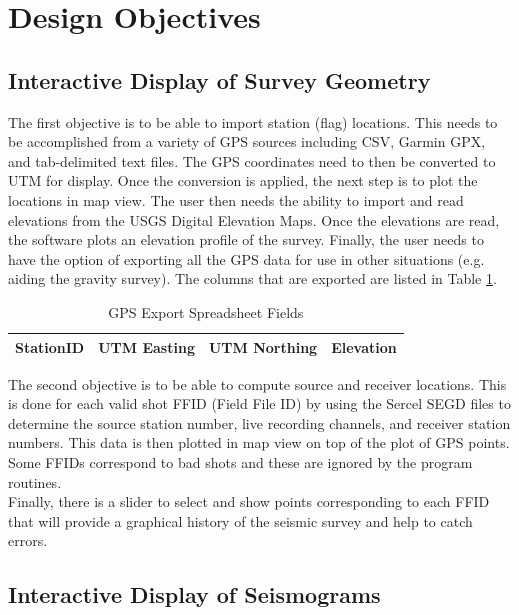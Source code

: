 \documentclass[12pt]{article}
\begin{document}
\section{Design Objectives}
\subsection{Interactive Display of Survey Geometry}

The first objective is to be able to import station (flag) locations. This needs to be accomplished from a variety of GPS sources including CSV, Garmin GPX, and tab-delimited text files. The GPS coordinates need to then be converted to UTM for display. Once the conversion is applied, the next step is to plot the locations in map view. The user then needs the ability to import and read elevations from the USGS Digital Elevation Maps. Once the elevations are read, the software plots an elevation profile of the survey. Finally, the user needs to have the option of exporting all the GPS data for use in other situations (e.g. aiding the gravity survey). The columns that are exported are listed in Table \ref{TAB:GPS}.

\begin{table}[h]
\caption{GPS Export Spreadsheet Fields}
\centering
\begin{tabular}{ c | c | c | c}
  \hline                  
  StationID & UTM Easting & UTM Northing & Elevation \\
  \hline
\end{tabular}
\label{TAB:GPS}
\end{table}

The second objective is to be able to compute source and receiver locations. This is done for each valid shot FFID (Field File ID) by using the Sercel SEGD files to determine the source station number, live recording channels, and receiver station numbers. This data is then plotted in map view on top of the plot of GPS points. Some FFIDs correspond to bad shots and these are ignored by the program routines.  \\

Finally, there is a slider to select and show points corresponding to each FFID that will provide a graphical history of the seismic survey and help to catch errors. 

\subsection{Interactive Display of Seismograms} 
\end{document}
